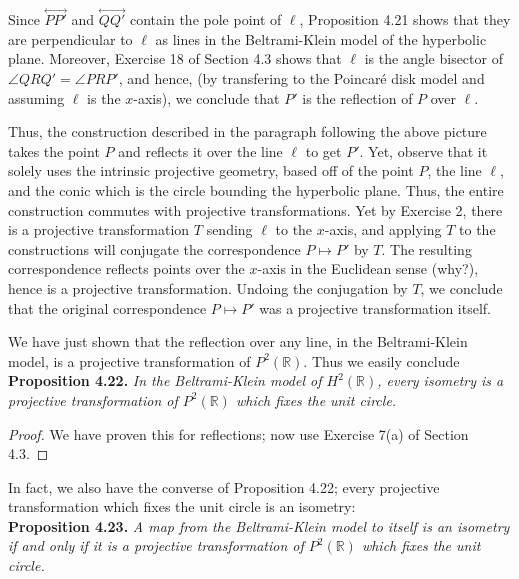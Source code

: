 \documentclass[leqno]{book}
\begin{document}
Since $\overset{\longleftrightarrow}{PP'}$ and $\overset{\longleftrightarrow}{QQ'}$ contain the pole point of $\ell$, Proposition 4.21 shows that they are perpendicular to $\ell$ as lines in the Beltrami-Klein model of the hyperbolic plane.  Moreover, Exercise 18 of Section 4.3 shows that $\ell$ is the angle bisector of $\angle QRQ'=\angle PRP'$, and hence, (by transfering to the Poincar\'e disk model and assuming $\ell$ is the $x$-axis), we conclude that $P'$ is the reflection of $P$ over $\ell$.

Thus, the construction described in the paragraph following the above picture takes the point $P$ and reflects it over the line $\ell$ to get $P'$.  Yet, observe that it solely uses the intrinsic projective geometry, based off of the point $P$, the line $\ell$, and the conic which is the circle bounding the hyperbolic plane.  Thus, the entire construction commutes with projective transformations.  Yet by Exercise 2, there is a projective transformation $T$ sending $\ell$ to the $x$-axis, and applying $T$ to the constructions will conjugate the correspondence $P\mapsto P'$ by $T$.  The resulting correspondence reflects points over the $x$-axis in the Euclidean sense (why?), hence is a projective transformation.  Undoing the conjugation by $T$, we conclude that the original correspondence $P\mapsto P'$ was a projective transformation itself.

We have just shown that the reflection over any line, in the Beltrami-Klein model, is a projective transformation of $P^2(\mathbb R)$.  Thus we easily conclude\\

\noindent\textbf{Proposition 4.22.} \emph{In the Beltrami-Klein model of $H^2(\mathbb R)$, every isometry is a projective transformation of $P^2(\mathbb R)$ which fixes the unit circle.}\begin{proof}
We have proven this for reflections; now use Exercise 7(a) of Section 4.3.
\end{proof}

\noindent In fact, we also have the converse of Proposition 4.22; every projective transformation which fixes the unit circle is an isometry:\\

\noindent\textbf{Proposition 4.23.} \emph{A map from the Beltrami-Klein model to itself is an isometry if and only if it is a projective transformation of $P^2(\mathbb R)$ which fixes the unit circle.}\\
\end{document}
